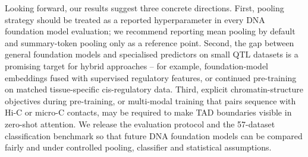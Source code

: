 \documentclass[11pt,a4paper]{article}
\begin{document}
Looking forward, our results suggest three concrete directions. First, pooling strategy should be treated as a reported hyperparameter in every DNA foundation model evaluation; we recommend reporting mean pooling by default and summary-token pooling only as a reference point. Second, the gap between general foundation models and specialised predictors on small QTL datasets is a promising target for hybrid approaches -- for example, foundation-model embeddings fused with supervised regulatory features, or continued pre-training on matched tissue-specific cis-regulatory data. Third, explicit chromatin-structure objectives during pre-training, or multi-modal training that pairs sequence with Hi-C or micro-C contacts, may be required to make TAD boundaries visible in zero-shot attention. We release the evaluation protocol and the 57-dataset classification benchmark so that future DNA foundation models can be compared fairly and under controlled pooling, classifier and statistical assumptions.



\end{document}
